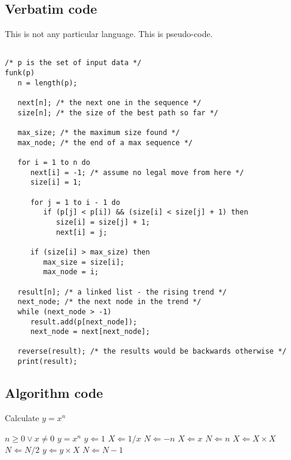 \documentclass[11pt]{article}
\begin{document}
\subsection{Verbatim code} %

This is not any particular language. This is pseudo-code.

\begin{verbatim}

/* p is the set of input data */
funk(p)
   n = length(p);
   
   next[n]; /* the next one in the sequence */
   size[n]; /* the size of the best path so far */
   
   max_size; /* the maximum size found */
   max_node; /* the end of a max sequence */
   
   for i = 1 to n do
      next[i] = -1; /* assume no legal move from here */
      size[i] = 1;
      
      for j = 1 to i - 1 do
         if (p[j] < p[i]) && (size[i] < size[j] + 1) then
            size[i] = size[j] + 1;
            next[i] = j;
            
      if (size[i] > max_size) then
         max_size = size[i];
         max_node = i;
         
   result[n]; /* a linked list - the rising trend */
   next_node; /* the next node in the trend */
   while (next_node > -1)
      result.add(p[next_node]);
      next_node = next[next_node];
      
   reverse(result); /* the results would be backwards otherwise */
   print(result);
\end{verbatim}


\subsection{Algorithm code} %

\begin{algorithm}                     
\caption{Calculate $y = x^n$}         
\label{alg1}                          
\begin{algorithmic}                   
\REQUIRE $n \geq 0 \vee x \neq 0$
\ENSURE $y = x^n$
\STATE $y \Leftarrow 1$
\STATE $X \Leftarrow 1 / x$
\STATE $N \Leftarrow -n$
\ELSE
\STATE $X \Leftarrow x$
\STATE $N \Leftarrow n$
\ENDIF
{}
\STATE $X \Leftarrow X \times X$
\STATE $N \Leftarrow N / 2$
\ELSE[$N$ is odd]
\STATE $y \Leftarrow y \times X$
\STATE $N \Leftarrow N - 1$
\ENDIF
\ENDWHILE
\end{algorithmic}
\end{algorithm}
\end{document}

